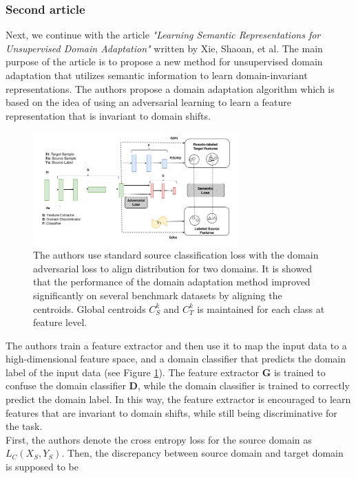 \subsubsection{Second article}
Next, we continue with the article \textit{"Learning Semantic Representations for Unsupervised Domain Adaptation"} written by Xie, Shaoan, et al. \cite{xie2018learning} The main purpose of the article is to propose a new method for unsupervised domain adaptation that utilizes semantic information to learn domain-invariant representations. The authors propose a domain adaptation algorithm which is based on the idea of using an adversarial learning to learn a feature representation that is invariant to domain shifts. 

\begin{figure}[H]
    \centering
    \includegraphics[width=0.7\textwidth]{Figures/From articles/sem_rep.png}
    \caption{The authors use standard source classification loss with the domain adversarial loss to align distribution for two domains. It is showed that the performance of the domain adaptation method improved significantly on several benchmark datasets by aligning the centroids. Global centroids $C_S^k$ and $C_T^k$ is maintained for each class at feature level.}
    \label{fig: sem_rep}
\end{figure}

 The authors train a feature extractor and then use it to map the input data to a high-dimensional feature space, and a domain classifier that predicts the domain label of the input data (see Figure \ref{fig: sem_rep}). The feature extractor \textbf{G} is trained to confuse the domain classifier \textbf{D}, while the domain classifier is trained to correctly predict the domain label. In this way, the feature extractor is encouraged to learn features that are invariant to domain shifts, while still being discriminative for the task.\\

 
 First, the authors denote the cross entropy loss for the source domain as $L_C(X_S, Y_S)$. Then, the discrepancy between source domain and target domain is supposed to be 

